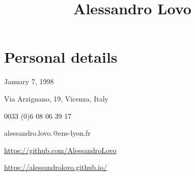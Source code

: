 \documentclass[11pt, a4 paper]{article}
\begin{document}
\title{Alessandro Lovo}
\date{}
\author{}
\maketitle


\section*{Personal details}
  \begin{multicols}{2}
    \begin{description}[style=multiline,leftmargin=2cm,align=right]
      \item[Birth] January 7, 1998
      \item[Address] Via Arzignano, 19, Vicenza, Italy
      \item[Phone] 0033 (0)6 08 06 39 17
      \item[Email]
        alessandro.lovo.@ens-lyon.fr

      \item[GitHub] {\small \url{https://github.com/AlessandroLovo}}
      \item[Website] {\small \url{https://alessandrolovo.github.io/}}
    \end{description}
  \end{multicols}
\end{document}
